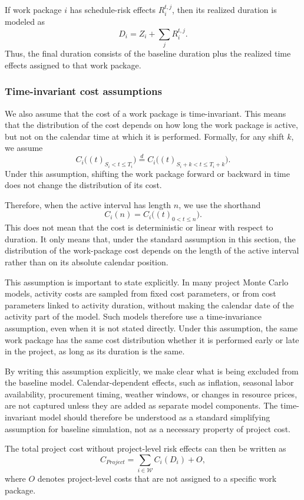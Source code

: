 \documentclass[11pt,a4paper]{article}
\newcommand{\cW}{\mathcal{W}}
\newcommand{\1}{\mathbf{1}}
\theoremstyle{definition}
\theoremstyle{plain}
\theoremstyle{remark}
\numberwithin{equation}{section}
\begin{document}
If work package $i$ has schedule-risk effects $R_i^{t,j}$, then its realized duration is modeled as
\[
D_i
=
Z_i+\sum_j R_i^{t,j}.
\]
Thus, the final duration consists of the baseline duration plus the realized time effects assigned to that work package.

\subsubsection{Time-invariant cost assumptions}

We also assume that the cost of a work package is time-invariant. This means that the distribution of the cost depends on how long the work package is active, but not on the calendar time at which it is performed. Formally, for any shift $k$, we assume
\[
C_i\bigl((t)_{S_i<t\leq T_i}\bigr)
\overset{d}{=}
C_i\bigl((t)_{S_i+k<t\leq T_i+k}\bigr).
\]
Under this assumption, shifting the work package forward or backward in time does not change the distribution of its cost.

Therefore, when the active interval has length $n$, we use the shorthand
\[
C_i(n)
=
C_i\bigl((t)_{0<t\leq n}\bigr).
\]
This does not mean that the cost is deterministic or linear with respect to duration. It only means that, under the standard assumption in this section, the distribution of the work-package cost depends on the length of the active interval rather than on its absolute calendar position.

This assumption is important to state explicitly. In many project Monte Carlo models, activity costs are sampled from fixed cost parameters, or from cost parameters linked to activity duration, without making the calendar date of the activity part of the model. Such models therefore use a time-invariance assumption, even when it is not stated directly. Under this assumption, the same work package has the same cost distribution whether it is performed early or late in the project, as long as its duration is the same.

By writing this assumption explicitly, we make clear what is being excluded from the baseline model. Calendar-dependent effects, such as inflation, seasonal labor availability, procurement timing, weather windows, or changes in resource prices, are not captured unless they are added as separate model components. The time-invariant model should therefore be understood as a standard simplifying assumption for baseline simulation, not as a necessary property of project cost.

The total project cost without project-level risk effects can then be written as
\[
C_{Project}
=
\sum_{i\in\cW} C_i(D_i)+O,
\]
where $O$ denotes project-level costs that are not assigned to a specific work package.
\end{document}
